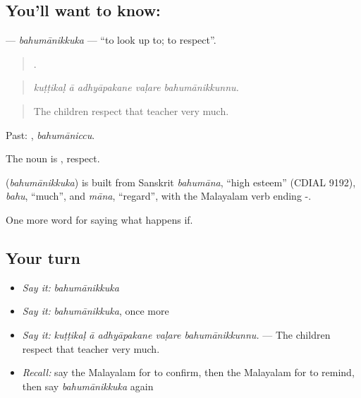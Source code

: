 \subsection*{You'll want to know: }
\textbf{} — \emph{bahumānikkuka} — \textquotedblleft{}to look up to; to respect\textquotedblright{}.

\begin{quote}
    .
\end{quote}

\begin{quote}
\emph{kuṭṭikaḷ ā adhyāpakane vaḷare bahumānikkunnu.}
\end{quote}

\begin{quote}
The children respect that teacher very much.
\end{quote}

Past: , \emph{bahumāniccu}.

The noun is , respect.

\begin{cousinweb}
\textbf{} (\emph{bahumānikkuka}) is built from Sanskrit \emph{bahumāna}, \textquotedblleft{}high esteem\textquotedblright{} (CDIAL 9192), \emph{bahu}, \textquotedblleft{}much\textquotedblright{}, and \emph{māna}, \textquotedblleft{}regard\textquotedblright{}, with the Malayalam verb ending -.
\end{cousinweb}

\begin{grammarlens}[title={What you've built}]
One more word for saying what happens if.
\end{grammarlens}

\subsection*{Your turn}
\begin{itemize}
\raggedright
  \item \emph{Say it:} \emph{bahumānikkuka}
  \item \emph{Say it:} \emph{bahumānikkuka}, once more
  \item \emph{Say it:} \emph{kuṭṭikaḷ ā adhyāpakane vaḷare bahumānikkunnu.} — The children respect that teacher very much.
  \item \emph{Recall:} say the Malayalam for to confirm, then the Malayalam for to remind, then say \emph{bahumānikkuka} again
\end{itemize}

